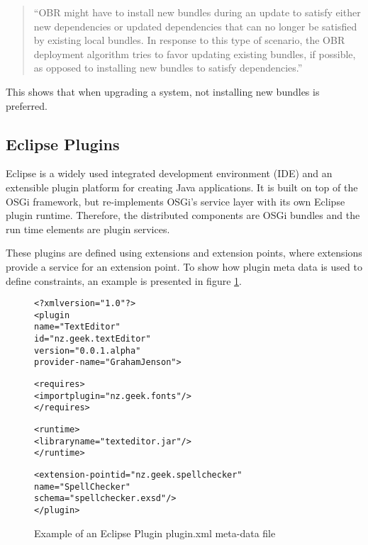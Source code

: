\begin{quotation}
``OBR might have to install new bundles during an update to satisfy either new dependencies or updated dependencies that can no longer be satisfied by existing local bundles. 
In response to this type of scenario, the OBR deployment algorithm tries to favor updating existing bundles, if possible, as opposed to installing new bundles to satisfy dependencies.''
\end{quotation}

This shows that when upgrading a system, not installing new bundles is preferred.

\subsection{Eclipse Plugins}
Eclipse is a widely used integrated development environment (IDE) and an extensible plugin platform for creating Java applications.
It is built on top of the OSGi framework, but re-implements OSGi's service layer with its own Eclipse plugin runtime.
Therefore, the distributed components are OSGi bundles and the run time elements are plugin services.

These plugins are defined using extensions and extension points, where extensions provide a service for an extension point.
To show how plugin meta data is used to define constraints, an example is presented in figure \ref{eclipseplugin}. 

\begin{figure}[htp]
\begin{center}
\begin{framed}
\begin{alltt}
<?xml version="1.0"?>
<plugin
    name="Text Editor"
    id="nz.geek.textEditor"
    version="0.0.1.alpha"
    provider-name="Graham Jenson">
    
    <requires>
        <import plugin="nz.geek.fonts"/>
    </requires>

    <runtime>
        <library name="texteditor.jar"/>
    </runtime>
    
    <extension-point id="nz.geek.spellchecker" 
        name="Spell Checker" 
        schema="spellchecker.exsd"/>
</plugin>
\end{alltt}
\end{framed}
  \caption{Example of an Eclipse Plugin plugin.xml meta-data file}
  \label{eclipseplugin}
\end{center}
\end{figure}


